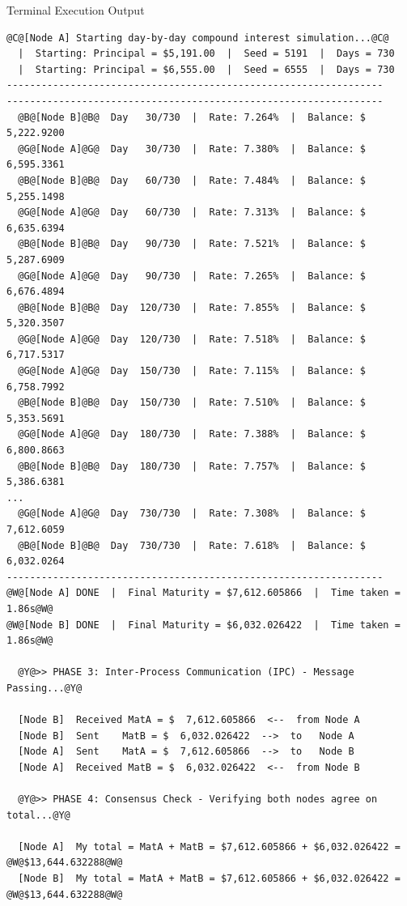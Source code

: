 \documentclass[11pt]{article}
\begin{document}
\begin{terminalbox}{Terminal Execution Output}
\begin{lstlisting}[style=terminalstyle]
@C@[Node A] Starting day-by-day compound interest simulation...@C@
  |  Starting: Principal = $5,191.00  |  Seed = 5191  |  Days = 730
  |  Starting: Principal = $6,555.00  |  Seed = 6555  |  Days = 730
-----------------------------------------------------------------
-----------------------------------------------------------------
  @B@[Node B]@B@  Day   30/730  |  Rate: 7.264%  |  Balance: $  5,222.9200
  @G@[Node A]@G@  Day   30/730  |  Rate: 7.380%  |  Balance: $  6,595.3361
  @B@[Node B]@B@  Day   60/730  |  Rate: 7.484%  |  Balance: $  5,255.1498
  @G@[Node A]@G@  Day   60/730  |  Rate: 7.313%  |  Balance: $  6,635.6394
  @B@[Node B]@B@  Day   90/730  |  Rate: 7.521%  |  Balance: $  5,287.6909
  @G@[Node A]@G@  Day   90/730  |  Rate: 7.265%  |  Balance: $  6,676.4894
  @B@[Node B]@B@  Day  120/730  |  Rate: 7.855%  |  Balance: $  5,320.3507
  @G@[Node A]@G@  Day  120/730  |  Rate: 7.518%  |  Balance: $  6,717.5317
  @G@[Node A]@G@  Day  150/730  |  Rate: 7.115%  |  Balance: $  6,758.7992
  @B@[Node B]@B@  Day  150/730  |  Rate: 7.510%  |  Balance: $  5,353.5691
  @G@[Node A]@G@  Day  180/730  |  Rate: 7.388%  |  Balance: $  6,800.8663
  @B@[Node B]@B@  Day  180/730  |  Rate: 7.757%  |  Balance: $  5,386.6381
...
  @G@[Node A]@G@  Day  730/730  |  Rate: 7.308%  |  Balance: $  7,612.6059
  @B@[Node B]@B@  Day  730/730  |  Rate: 7.618%  |  Balance: $  6,032.0264
-----------------------------------------------------------------
@W@[Node A] DONE  |  Final Maturity = $7,612.605866  |  Time taken = 1.86s@W@
@W@[Node B] DONE  |  Final Maturity = $6,032.026422  |  Time taken = 1.86s@W@

  @Y@>> PHASE 3: Inter-Process Communication (IPC) - Message Passing...@Y@
  
  [Node B]  Received MatA = $  7,612.605866  <--  from Node A
  [Node B]  Sent    MatB = $  6,032.026422  -->  to   Node A
  [Node A]  Sent    MatA = $  7,612.605866  -->  to   Node B
  [Node A]  Received MatB = $  6,032.026422  <--  from Node B

  @Y@>> PHASE 4: Consensus Check - Verifying both nodes agree on total...@Y@

  [Node A]  My total = MatA + MatB = $7,612.605866 + $6,032.026422 = @W@$13,644.632288@W@
  [Node B]  My total = MatA + MatB = $7,612.605866 + $6,032.026422 = @W@$13,644.632288@W@


\end{lstlisting}
\end{terminalbox}
\end{document}
